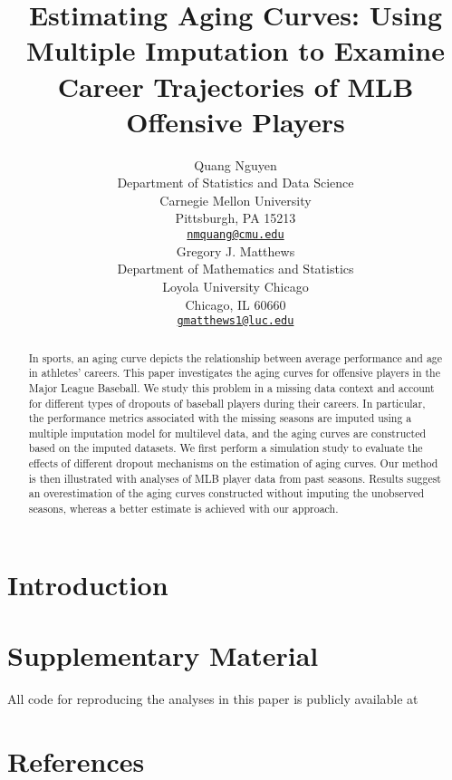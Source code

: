 \documentclass{article}
\title{\textbf{Estimating Aging Curves: Using Multiple Imputation to Examine Career Trajectories of MLB Offensive Players}}
\author{
    Quang Nguyen
   \\
    Department of Statistics and Data Science \\
    Carnegie Mellon University \\
  Pittsburgh, PA 15213 \\
  \texttt{\href{mailto:nmquang@cmu.edu}{\nolinkurl{nmquang@cmu.edu}}} \\
   \And
    Gregory J. Matthews
   \\
    Department of Mathematics and Statistics \\
    Loyola University Chicago \\
  Chicago, IL 60660 \\
  \texttt{\href{mailto:gmatthews1@luc.edu}{\nolinkurl{gmatthews1@luc.edu}}} \\
  }
\begin{document}
\maketitle


\begin{abstract}
In sports, an aging curve depicts the relationship between average
performance and age in athletes' careers. This paper investigates the
aging curves for offensive players in the Major League Baseball. We
study this problem in a missing data context and account for different
types of dropouts of baseball players during their careers. In
particular, the performance metrics associated with the missing seasons
are imputed using a multiple imputation model for multilevel data, and
the aging curves are constructed based on the imputed datasets. We first
perform a simulation study to evaluate the effects of different dropout
mechanisms on the estimation of aging curves. Our method is then
illustrated with analyses of MLB player data from past seasons. Results
suggest an overestimation of the aging curves constructed without
imputing the unobserved seasons, whereas a better estimate is achieved
with our approach.
\end{abstract}


\hypertarget{sec:intro}{%
\section{Introduction}\label{sec:intro}}

\hypertarget{supplementary-material}{%
\section*{Supplementary Material}\label{supplementary-material}}

All code for reproducing the analyses in this paper is publicly
available at

\hypertarget{references}{%
\section{References}\label{references}}



\end{document}
